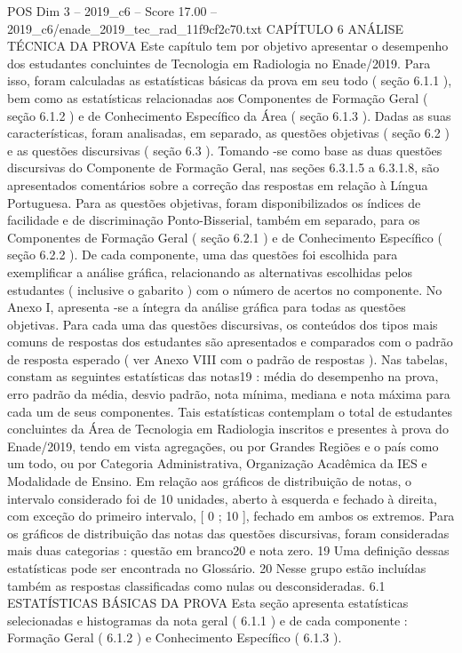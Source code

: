 \begin{textsample}{POS Dim 3 – 2019\_c6 – Score 17.00 – 2019\_c6/enade\_2019\_tec\_rad\_11f9cf2c70.txt}  \label{ex:f3_pos_009}
CAPÍTULO 6 ANÁLISE TÉCNICA DA PROVA Este capítulo tem por objetivo apresentar o desempenho dos estudantes concluintes de Tecnologia em Radiologia no Enade/2019.
Para isso, foram calculadas as estatísticas básicas da prova em seu todo ( seção 6.1.1 ), bem como as estatísticas relacionadas aos Componentes de Formação Geral ( seção 6.1.2 ) e de Conhecimento Específico da Área ( seção 6.1.3 ).
Dadas as suas características, foram analisadas, em separado, as questões objetivas ( seção 6.2 ) e as questões discursivas ( seção 6.3 ).
Tomando -se como base as duas questões discursivas do Componente de Formação Geral, nas seções 6.3.1.5 a 6.3.1.8, são apresentados comentários sobre a correção das respostas em relação à Língua Portuguesa.
Para as questões objetivas, foram disponibilizados os índices de facilidade e de discriminação Ponto-Bisserial, também em separado, para os Componentes de Formação Geral ( seção 6.2.1 ) e de Conhecimento Específico ( seção 6.2.2 ).
De cada componente, uma das questões foi escolhida para exemplificar a análise gráfica, relacionando as alternativas escolhidas pelos estudantes ( inclusive o gabarito ) com o número de acertos no componente.
No Anexo I, apresenta -se a íntegra da análise gráfica para todas as questões objetivas.
Para cada uma das questões discursivas, os conteúdos dos tipos mais comuns de respostas dos estudantes são apresentados e comparados com o padrão de resposta esperado ( ver Anexo VIII com o padrão de respostas ).
Nas tabelas, constam as seguintes estatísticas das notas19 : média do desempenho na prova, erro padrão da média, desvio padrão, nota mínima, mediana e nota máxima para cada um de seus componentes.
Tais estatísticas contemplam o total de estudantes concluintes da Área de Tecnologia em Radiologia inscritos e presentes à prova do Enade/2019, tendo em vista agregações, ou por Grandes Regiões e o país como um todo, ou por Categoria Administrativa, Organização Acadêmica da IES e Modalidade de Ensino.
Em relação aos gráficos de distribuição de notas, o intervalo considerado foi de 10 unidades, aberto à esquerda e fechado à direita, com exceção do primeiro intervalo, [ 0 ; 10 ], fechado em ambos os extremos.
Para os gráficos de distribuição das notas das questões discursivas, foram consideradas mais duas categorias : questão em branco20 e nota zero. 19 Uma definição dessas estatísticas pode ser encontrada no Glossário. 20 Nesse grupo estão incluídas também as respostas classificadas como nulas ou desconsideradas. 6.1 ESTATÍSTICAS BÁSICAS DA PROVA Esta seção apresenta estatísticas selecionadas e histogramas da nota geral ( 6.1.1 ) e de cada componente : Formação Geral ( 6.1.2 ) e Conhecimento Específico ( 6.1.3 ).

\end{textsample}
